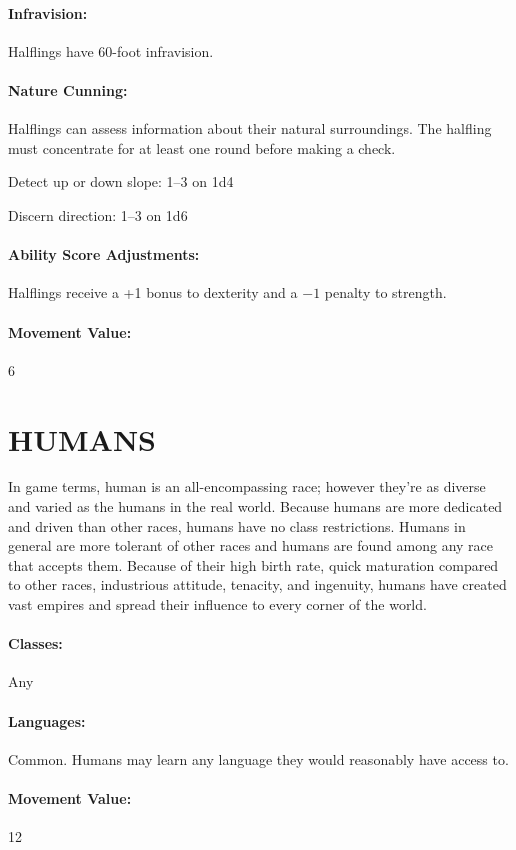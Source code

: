 \begin{multicols}{2}
\paragraph{Infravision:} Halflings have 60-foot infravision.

\paragraph{Nature Cunning:} Halflings can assess information about their natural surroundings.  The halfling must concentrate for at least one round before making a check.

Detect up or down slope: 1--3 on 1d4

Discern direction: 1--3 on 1d6

\paragraph{Ability Score Adjustments:} Halflings receive a +1 bonus to dexterity and a $-1$ penalty to strength.

\paragraph{Movement Value:} 6

\section{HUMANS}

In game terms, human is an all-encompassing race; however they're as diverse and varied as the humans in the real world.  Because humans are more dedicated and driven than other races, humans have no class restrictions.  Humans in general are more tolerant of other races and humans are found among any race that accepts them.  Because of their high birth rate, quick maturation compared to other races, industrious attitude, tenacity, and ingenuity, humans have created vast empires and spread their influence to every corner of the world.

\paragraph{Classes:} Any

\paragraph{Languages:} Common.  Humans may learn any language they would reasonably have access to.

\paragraph{Movement Value:} 12

\end{multicols}

